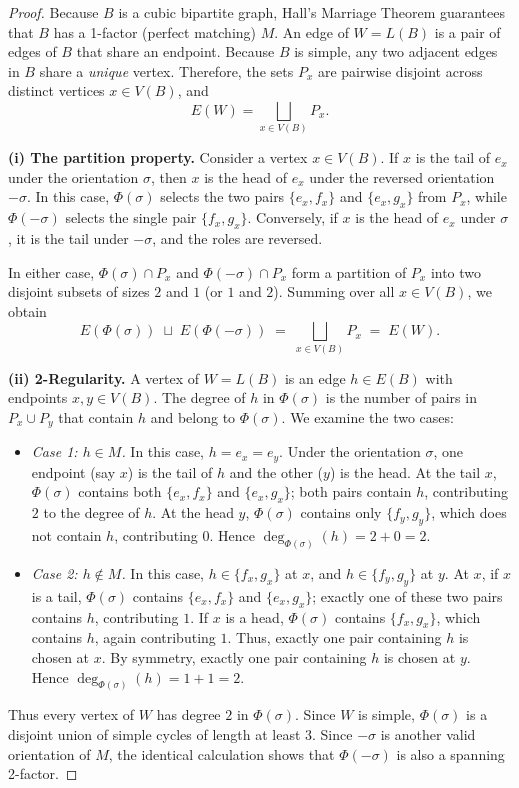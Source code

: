 \documentclass[11pt,reqno]{amsart}
\theoremstyle{definition}
\theoremstyle{remark}
\begin{document}
\begin{proof}
Because $B$ is a cubic bipartite graph, Hall's Marriage Theorem guarantees that $B$ has a 1-factor (perfect matching) $M$. An edge of $W = L(B)$ is a pair of edges of $B$ that share an endpoint. Because $B$ is simple, any two adjacent edges in $B$ share a \emph{unique} vertex. Therefore, the sets $P_x$ are pairwise disjoint across distinct vertices $x \in V(B)$, and
\[
E(W) = \bigsqcup_{x \in V(B)} P_x.
\]

\medskip
\noindent\textbf{(i) The partition property.}
Consider a vertex $x \in V(B)$. If $x$ is the tail of $e_x$ under the orientation $\sigma$, then $x$ is the head of $e_x$ under the reversed orientation $-\sigma$. In this case, $\Phi(\sigma)$ selects the two pairs $\{e_x, f_x\}$ and $\{e_x, g_x\}$ from $P_x$, while $\Phi(-\sigma)$ selects the single pair $\{f_x, g_x\}$. Conversely, if $x$ is the head of $e_x$ under $\sigma$, it is the tail under $-\sigma$, and the roles are reversed.

In either case, $\Phi(\sigma) \cap P_x$ and $\Phi(-\sigma) \cap P_x$ form a partition of $P_x$ into two disjoint subsets of sizes $2$ and $1$ (or $1$ and $2$). Summing over all $x \in V(B)$, we obtain
\[
E(\Phi(\sigma)) \;\sqcup\; E(\Phi(-\sigma)) \;=\; \bigsqcup_{x \in V(B)} P_x \;=\; E(W).
\]

\medskip
\noindent\textbf{(ii) 2-Regularity.}
A vertex of $W = L(B)$ is an edge $h \in E(B)$ with endpoints $x, y \in V(B)$. The degree of $h$ in $\Phi(\sigma)$ is the number of pairs in $P_x \cup P_y$ that contain $h$ and belong to $\Phi(\sigma)$. We examine the two cases:

\begin{itemize}
    \item \emph{Case 1: $h \in M$.} In this case, $h = e_x = e_y$. Under the orientation $\sigma$, one endpoint (say $x$) is the tail of $h$ and the other ($y$) is the head.
    At the tail $x$, $\Phi(\sigma)$ contains both $\{e_x, f_x\}$ and $\{e_x, g_x\}$; both pairs contain $h$, contributing $2$ to the degree of $h$.
    At the head $y$, $\Phi(\sigma)$ contains only $\{f_y, g_y\}$, which does not contain $h$, contributing $0$.
    Hence $\deg_{\Phi(\sigma)}(h) = 2 + 0 = 2$.
    
    \item \emph{Case 2: $h \notin M$.} In this case, $h \in \{f_x, g_x\}$ at $x$, and $h \in \{f_y, g_y\}$ at $y$.
    At $x$, if $x$ is a tail, $\Phi(\sigma)$ contains $\{e_x, f_x\}$ and $\{e_x, g_x\}$; exactly one of these two pairs contains $h$, contributing $1$. If $x$ is a head, $\Phi(\sigma)$ contains $\{f_x, g_x\}$, which contains $h$, again contributing $1$.
    Thus, exactly one pair containing $h$ is chosen at $x$.
    By symmetry, exactly one pair containing $h$ is chosen at $y$.
    Hence $\deg_{\Phi(\sigma)}(h) = 1 + 1 = 2$.
\end{itemize}
Thus every vertex of $W$ has degree $2$ in $\Phi(\sigma)$. Since $W$ is simple, $\Phi(\sigma)$ is a disjoint union of simple cycles of length at least $3$. Since $-\sigma$ is another valid orientation of $M$, the identical calculation shows that $\Phi(-\sigma)$ is also a spanning 2-factor.


\end{proof}
\end{document}
